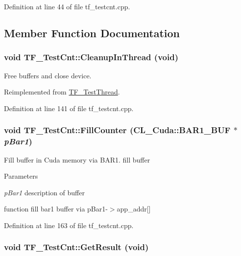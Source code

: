 Definition at line 44 of file tf\_\-testcnt.cpp.

\subsection{Member Function Documentation}
\hypertarget{classTF__TestCnt_a95c7a76a1fe574d1ed260a07f9469501}{
\subsubsection[{CleanupInThread}]{\setlength{\rightskip}{0pt plus 5cm}void TF\_\-TestCnt::CleanupInThread (void)}}
\label{classTF__TestCnt_a95c7a76a1fe574d1ed260a07f9469501}


Free buffers and close device. 

Reimplemented from \hyperlink{classTF__TestThread_a36cfb1a6da55b938b5634ac86adbae2f}{TF\_\-TestThread}.

Definition at line 141 of file tf\_\-testcnt.cpp.\hypertarget{classTF__TestCnt_adda7871a49f18d707228c85d7169c1df}{
\subsubsection[{FillCounter}]{\setlength{\rightskip}{0pt plus 5cm}void TF\_\-TestCnt::FillCounter ({\bf CL\_\-Cuda::BAR1\_\-BUF} $\ast$ {\em pBar1})}}
\label{classTF__TestCnt_adda7871a49f18d707228c85d7169c1df}


Fill buffer in Cuda memory via BAR1. fill buffer


\begin{DoxyParams}{Parameters}
\item[{\em pBar1}]description of buffer\end{DoxyParams}
function fill bar1 buffer via pBar1-\/$>$app\_\-addr\mbox{[}\mbox{]} 

Definition at line 163 of file tf\_\-testcnt.cpp.\hypertarget{classTF__TestCnt_af1d8c610c3b708401c19ad8256db27be}{
\subsubsection[{GetResult}]{\setlength{\rightskip}{0pt plus 5cm}void TF\_\-TestCnt::GetResult (void)}}
\label{classTF__TestCnt_af1d8c610c3b708401c19ad8256db27be}


